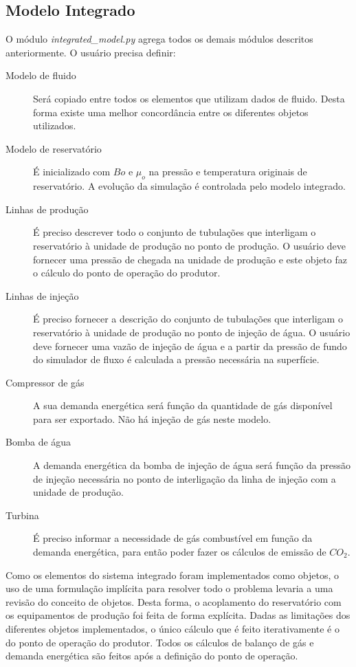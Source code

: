 \documentclass[final,5p]{elsarticle}
\numberwithin{equation}{section}
\begin{document}
    \subsection{Modelo Integrado}

        O módulo \emph{integrated\_model.py} agrega todos os demais módulos descritos anteriormente. O usuário precisa definir:

        \begin{description}
            \item[Modelo de fluido] Será copiado entre todos os elementos que utilizam dados de fluido. Desta forma existe uma melhor concordância entre os diferentes objetos utilizados.
            \item[Modelo de reservatório] É inicializado com $Bo$ e $\mu_o$ na pressão e temperatura originais de reservatório. A evolução da simulação é controlada pelo modelo integrado.
            \item[Linhas de produção] É preciso descrever todo o conjunto de tubulações que interligam o reservatório à unidade de produção no ponto de produção. O usuário deve fornecer uma pressão de chegada na unidade de produção e este objeto faz o cálculo do ponto de operação do produtor.
            \item[Linhas de injeção] É preciso fornecer a descrição do conjunto de tubulações que interligam o reservatório à unidade de produção no ponto de injeção de água. O usuário deve fornecer uma vazão de injeção de água e a partir da pressão de fundo do simulador de fluxo é calculada a pressão necessária na superfície.
            \item[Compressor de gás] A sua demanda energética será função da quantidade de gás disponível para ser exportado. Não há injeção de gás neste modelo.
            \item[Bomba de água] A demanda energética da bomba de injeção de água será função da pressão de injeção necessária no ponto de interligação da linha de injeção com a unidade de produção.
            \item[Turbina] É preciso informar a necessidade de gás combustível em função da demanda energética, para então poder fazer os cálculos de emissão de $CO_2$.
        \end{description}

        Como os elementos do sistema integrado foram implementados como objetos, o uso de uma formulação implícita para resolver todo o problema levaria a uma revisão do conceito de objetos. Desta forma, o acoplamento do reservatório com os equipamentos de produção foi feita de forma explícita. Dadas as limitações dos diferentes objetos implementados, o único cálculo que é feito iterativamente é o do ponto de operação do produtor. Todos os cálculos de balanço de gás e demanda energética são feitos após a definição do ponto de operação.
\end{document}
